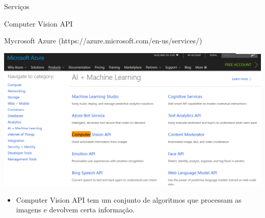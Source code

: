 \documentclass{beamer}
\begin{document}
\begin{frame}{Serviços}

\begin{exampleblock}{}
   \begin{center}
   Computer Vision API
   \end{center}
\end{exampleblock}
Mycrosoft Azure (https://azure.microsoft.com/en-us/services/)   

\begin{center}
\includegraphics[width=.8\textwidth]{img/Azuri.png}   
\end{center}
\begin{itemize}\tiny
\item Computer Vision API tem um conjunto de algoritmos que
processam as imagens e devolvem certa informação.
\end{itemize}

\end{frame}
\end{document}
